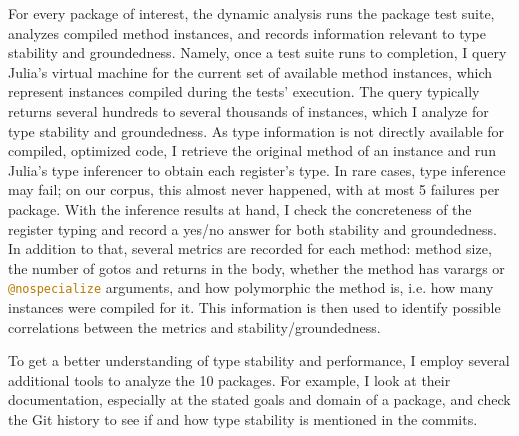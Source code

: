 \documentclass[oneside,openright,titlepage,numbers=noenddot,%
headinclude,footinclude,cleardoublepage=empty,abstract=on,
BCOR=5mm,paper=a4,fontsize=11pt,
dvipsnames
]{scrreprt}
\renewcommand{\c}[1]{\lstinline[language=Julia]!#1!\xspace}
\begin{document}
For every package of interest, the dynamic analysis runs the package test suite,
analyzes compiled method instances, and records information relevant to
type stability and groundedness. Namely, once a test suite runs to completion,
I query Julia's virtual machine for the current set of available method
instances, which represent instances compiled during the tests' execution.
The query typically returns
several hundreds to several thousands of instances,
which I
analyze for type stability and groundedness. As type information is not
directly available for compiled, optimized code, I retrieve the original method
of an instance and run Julia's type inferencer to obtain each register's type.
In rare cases, type inference may fail;
on our corpus, this almost never happened, with at most 5 failures per package.
With the inference results at hand, I check the concreteness of the register
typing and record a yes/no answer for both stability and groundedness. In
addition to that, several metrics are recorded for each method:
method size, the number of gotos and returns in the body, whether the method has
varargs or \c{@nospecialize} arguments, and
how polymorphic the method is, i.e. how many instances were compiled for it.
This information is then used to identify possible correlations between the
metrics and stability/groundedness.

To get a better understanding of type stability and performance, I employ
several additional tools to analyze the 10 packages. For example, I look at
their documentation, especially at the stated goals and domain of a package, and
check the Git history to see if and how type stability is mentioned in the
commits.

\end{document}
